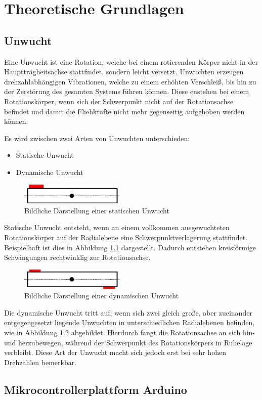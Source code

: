 
\chapter{Theoretische Grundlagen}

\section{Unwucht}
Eine Unwucht ist eine Rotation, welche bei einem rotierenden Körper nicht in der Hauptträgheitsachse stattfindet, sondern leicht versetzt.
Unwuchten erzeugen drehzahlabhängigen Vibrationen, welche zu einem erhöhten Verschleiß, bis hin zu der Zerstörung des gesamten Systems führen können.
Diese enstehen bei einem Rotationskörper, wenn sich der Schwerpunkt nicht auf der Rotationsachse befindet und damit die Fliehkräfte nicht mehr gegenseitig aufgehoben werden können. \cite{unwucht_wiki:2011}

Es wird zwischen zwei Arten von Unwuchten unterschieden:
\begin{itemize}
    \item Statische Unwucht
    \item Dynamische Unwucht
\end{itemize}

\begin{figure}[H]
    \centering
    \includegraphics[width=5cm]{images/chapter/02/static_imbalance.png}
    \caption{Bildliche Darstellung einer statischen Unwucht}
    \label{fig:static_imbalance}
\end{figure}
Statische Unwucht entsteht, wenn an einem vollkommen ausgewuchteten Rotationskörper auf der Radialebene eine Schwerpunktverlagerung stattfindet. Beispielhaft ist dies in Abbildung \ref{fig:static_imbalance} dargestellt.
Dadurch entstehen kreisförmige Schwingungen rechtwinklig zur Rotationsachse.

\begin{figure}[H]
    \centering
    \includegraphics[width=5cm]{images/chapter/02/dynamic_imbalance.png}
    \caption{Bildliche Darstellung einer dynamischen Unwucht}
    \label{fig:dynamic_imbalance}
\end{figure}
Die dynamische Unwucht tritt auf, wenn sich zwei gleich große, aber zueinander entgegengesetzt liegende Unwuchten in unterschiedlichen Radialebenen befinden, wie in Abbildung \ref{fig:dynamic_imbalance} abgebildet.
Hierdurch fängt die Rotationsachse an sich hin- und herzubewegen, während der Schwerpunkt des Rotationskörpers in Ruhelage verbleibt.
Diese Art der Unwucht macht sich jedoch erst bei sehr hohen Drehzahlen bemerkbar. \cite[S. 8]{vibromatrix:2007}

\section{Mikrocontrollerplattform Arduino}
